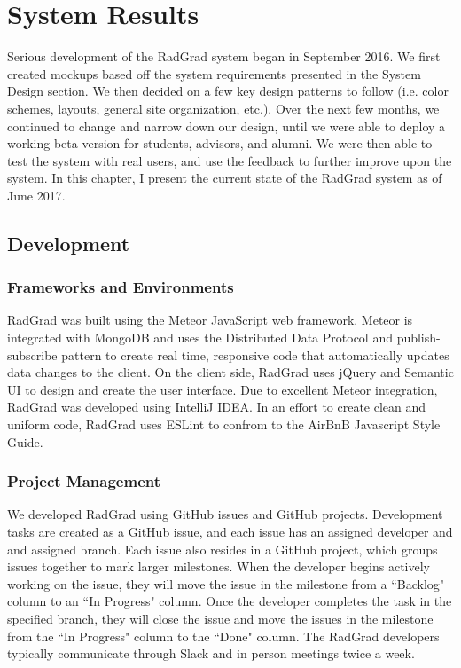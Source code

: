 \chapter{System Results}
\label{system-results}
Serious development of the RadGrad system began in September 2016. We first created mockups based off the system requirements presented in the System Design section. We then decided on a few key design patterns to follow (i.e. color schemes, layouts, general site organization, etc.). Over the next few months, we continued to change and narrow down our design, until we were able to deploy a working beta version for students, advisors, and alumni. We were then able to test the system with real users, and use the feedback to further improve upon the system. In this chapter, I present the current state of the RadGrad system as of June 2017.

\section{Development}
\subsection{Frameworks and Environments}
RadGrad was built using the Meteor JavaScript web framework. Meteor is integrated with MongoDB and uses the Distributed Data Protocol and publish-subscribe pattern to create real time, responsive code that automatically updates data changes to the client. On the client side, RadGrad uses jQuery and Semantic UI to design and create the user interface. Due to excellent Meteor integration, RadGrad was developed using IntelliJ IDEA. In an effort to create clean and uniform code, RadGrad uses ESLint to confrom to the AirBnB Javascript Style Guide. 

\subsection{Project Management}
We developed RadGrad using GitHub issues and GitHub projects. Development tasks are created as a GitHub issue, and each issue has an assigned developer and and assigned branch. Each issue also resides in a GitHub project, which groups issues together to mark larger milestones. When the developer begins actively working on the issue, they will move the issue in the milestone from a ``Backlog" column to an ``In Progress" column. Once the developer completes the task in the specified branch, they will close the issue and move the issues in the milestone from the ``In Progress" column to the ``Done" column. The RadGrad developers typically communicate through Slack and in person meetings twice a week. 

